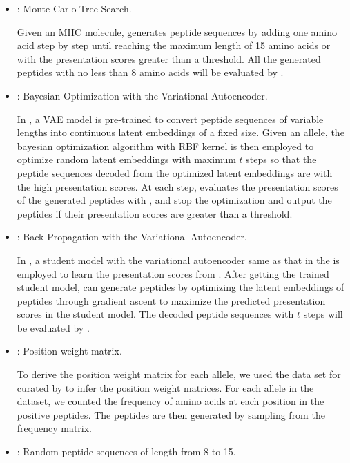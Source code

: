 \documentclass[letterpaper]{article}
\begin{document}
\begin{itemize}
	\item \mcts: Monte Carlo Tree Search.
	      
	      Given an MHC molecule, \mcts generates peptide sequences by adding one amino acid step by step
	      until reaching the maximum length of 15 amino acids or with the presentation scores greater than a threshold.
	      All the generated peptides with no less than 8 amino acids will be evaluated by \mhcflurrynd.
	\item \bovae: Bayesian Optimization with the Variational Autoencoder.
	
	      In \bovae, a VAE model is pre-trained to convert peptide sequences of variable lengths into continuous latent 
	      embeddings of a fixed size.
	      Given an allele, the bayesian optimization algorithm with RBF kernel is then employed to optimize random latent embeddings 
	      with maximum $t$ steps so that the peptide sequences decoded from the optimized latent embeddings are with the high presentation scores.
	      At each step, \bovae evaluates the presentation scores of the generated peptides with \mhcflurrynd, and stop the optimization and 
	      output the peptides if their presentation scores are greater than a threshold.
	\item \bpvae: Back Propagation with the Variational Autoencoder.
		  
		  In \bpvae, a student model with the variational autoencoder same as that in the \bovae is employed to learn the presentation scores 
		  from \mhcflurrynd.
		  After getting the trained student model, \bpvae can generate peptides by optimizing the latent embeddings of peptides through 
		  gradient ascent to maximize the predicted presentation scores in the student model.
	      The decoded peptide sequences with $t$ steps will be evaluated by \mhcflurrynd.
	\item \pwm: Position weight matrix.
	
	      To derive the position weight matrix for each allele, we used the data set for \mhcflurrynd curated by \cite{odonnell2020} to 
	      infer the position weight matrices.
	      For each allele in the dataset, we counted the frequency of amino acids at each position in the positive peptides.
	      The peptides are then generated by sampling from the frequency matrix.
	\item \random: Random peptide sequences of length from 8 to 15.
\end{itemize}
\end{document}
